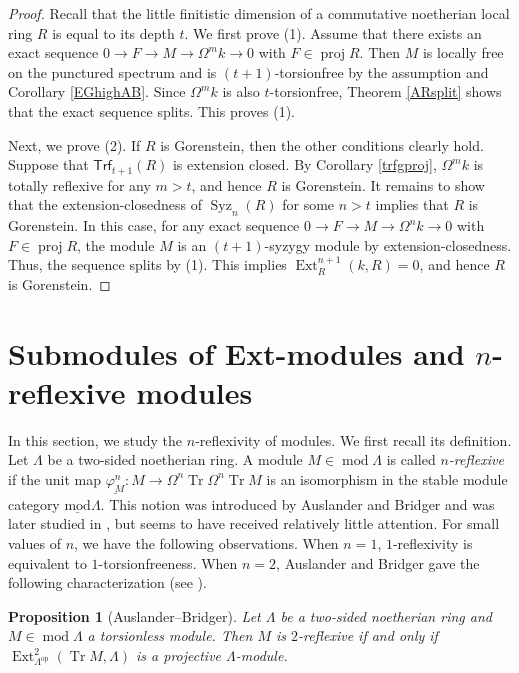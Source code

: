 \documentclass{amsart}
\newtheorem{prop}[thm]{Proposition}
\theoremstyle{definition}
\theoremstyle{remark}
\numberwithin{equation}{thm}
\def\Ext{\operatorname{Ext}}
\def\lmod{\operatorname{\underline{mod}}}
\def\mod{\operatorname{mod}}
\def\proj{\operatorname{proj}}
\def\syz{\Omega}
\def\Syz{\operatorname{Syz}}
\def\Trf{\mathsf{Trf}}
\def\tr{\operatorname{Tr}}
\begin{document}
\begin{proof}
Recall that the little finitistic dimension of a commutative noetherian local ring $R$ is equal to its depth $t$. We first prove (1). Assume that there exists an exact sequence $0\to F\to M\to\syz^m k\to0$ with $F\in\proj R$. Then $M$ is locally free on the punctured spectrum and is $(t+1)$-torsionfree by the assumption and Corollary \ref{EGhighAB}. Since $\syz^m k$ is also $t$-torsionfree, Theorem \ref{ARsplit} shows that the exact sequence splits. This proves (1).

Next, we prove (2). If $R$ is Gorenstein, then the other conditions clearly hold. Suppose that $\Trf_{t+1}(R)$ is extension closed. By Corollary \ref{trfgproj}, $\syz^m k$ is totally reflexive for any $m>t$, and hence $R$ is Gorenstein. It remains to show that the extension-closedness of $\Syz_n(R)$ for some $n>t$ implies that $R$ is Gorenstein. In this case, for any exact sequence $0\to F\to M\to\syz^n k\to0$ with $F\in\proj R$, the module $M$ is an $(t+1)$-syzygy module by extension-closedness. Thus, the sequence splits by (1). This implies $\Ext^{n+1}_R(k,R)=0$, and hence $R$ is Gorenstein.
\end{proof}
\section{Submodules of Ext-modules and $n$-reflexive modules}
In this section, we study the $n$-reflexivity of modules.
We first recall its definition.
Let $\Lambda$ be a two-sided noetherian ring.
A module $M\in\mod\Lambda$ is called {\em $n$-reflexive} if the unit map $\underline{\varphi_M^n}:M\to\syz^n\tr\syz^n\tr M$ is an isomorphism in the stable module category $\lmod\Lambda$.
This notion was introduced by Auslander and Bridger \cite{AB} and was later studied in \cite{As,Marc}, but seems to have received relatively little attention.
For small values of $n$, we have the following observations.
When $n=1$, $1$-reflexivity is equivalent to $1$-torsionfreeness.
When $n=2$, Auslander and Bridger gave the following characterization (see \cite[p.~143]{AB}).

\begin{prop}[Auslander--Bridger]\label{ext2proj}
Let $\Lambda$ be a two-sided noetherian ring and $M\in\mod\Lambda$ a torsionless module.
Then $M$ is $2$-reflexive if and only if $\Ext^2_{\Lambda^{\mathrm{op}}}(\tr M,\Lambda)$ is a projective $\Lambda$-module.
\end{prop}
\end{document}
